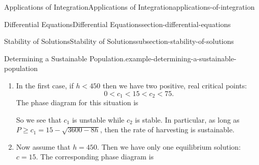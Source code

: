 \documentclass[oneside,10pt,]{book}
\numberwithin{equation}{section}
\newcommand{\dv}[3][]{\dfrac{d^{#1} #2}{d #3^{#1}}}
\newcommand{\lt}{<}
\begin{document}
\begin{chapterptx}{Applications of Integration}{}{Applications of Integration}{}{}{applications-of-integration}
\begin{sectionptx}{Differential Equations}{}{Differential Equations}{}{}{section-differential-equations}
\begin{subsectionptx}{Stability of Solutions}{}{Stability of Solutions}{}{}{subsection-stability-of-solutions}
\begin{example}{Determining a Sustainable Population.}{example-determining-a-sustainable-population}
\leavevmode%
\begin{enumerate}
\item\hypertarget{li-65}{}\hypertarget{p-763}{}%
In the first case, if \(h \lt 450\) then we have two positive, real critical points:%
\begin{equation*}
0 \lt c_{1} \lt 15 \lt c_{2} \lt 75.
\end{equation*}
The phase diagram for this situation is%
\begin{figure}
\centering
{
}
\end{figure}
\hypertarget{p-764}{}%
So we see that \(c_{1}\) is unstable while \(c_{2}\) is stable. In particular, as long as \(P\geq c_{1} = 15 - \sqrt{3600 - 8h}\), then the rate of harvesting is sustainable.%
\item\hypertarget{li-66}{}\hypertarget{p-765}{}%
Now assume that \(h = 450\). Then we have only one equilibrium solution: \(c = 15\). The corresponding phase diagram is%
\begin{figure}
\centering
{
    }
\end{figure}
\end{enumerate}
\end{example}
\end{subsectionptx}
\end{sectionptx}
\end{chapterptx}
\end{document}
